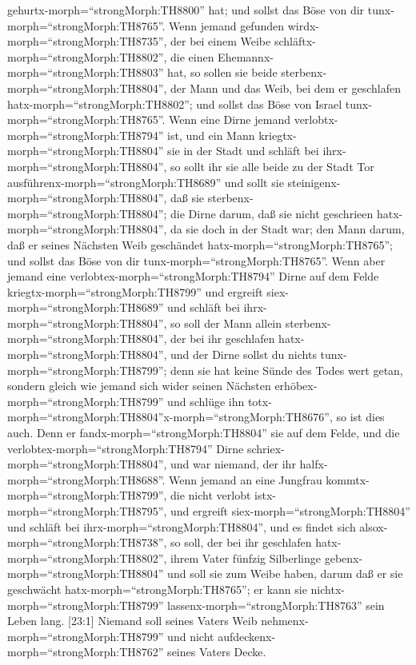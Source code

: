 gehurtx-morph=``strongMorph:TH8800'' hat; und sollst das Böse von dir
tunx-morph=``strongMorph:TH8765''.  Wenn jemand gefunden
wirdx-morph=``strongMorph:TH8735'', der bei einem Weibe
schläftx-morph=``strongMorph:TH8802'', die einen
Ehemannx-morph=``strongMorph:TH8803'' hat, so sollen sie beide
sterbenx-morph=``strongMorph:TH8804'', der Mann und das Weib, bei dem er
geschlafen hatx-morph=``strongMorph:TH8802''; und sollst das Böse von
Israel tunx-morph=``strongMorph:TH8765''.  Wenn eine Dirne
jemand verlobtx-morph=``strongMorph:TH8794'' ist, und ein Mann
kriegtx-morph=``strongMorph:TH8804'' sie in der Stadt und schläft bei
ihrx-morph=``strongMorph:TH8804'',  so sollt ihr sie alle
beide zu der Stadt Tor ausführenx-morph=``strongMorph:TH8689'' und sollt
sie steinigenx-morph=``strongMorph:TH8804'', daß sie
sterbenx-morph=``strongMorph:TH8804''; die Dirne darum, daß sie nicht
geschrieen hatx-morph=``strongMorph:TH8804'', da sie doch in der Stadt
war; den Mann darum, daß er seines Nächsten Weib geschändet
hatx-morph=``strongMorph:TH8765''; und sollst das Böse von dir
tunx-morph=``strongMorph:TH8765''.  Wenn aber jemand eine
verlobtex-morph=``strongMorph:TH8794'' Dirne auf dem Felde
kriegtx-morph=``strongMorph:TH8799'' und ergreift
siex-morph=``strongMorph:TH8689'' und schläft bei
ihrx-morph=``strongMorph:TH8804'', so soll der Mann allein
sterbenx-morph=``strongMorph:TH8804'', der bei ihr geschlafen
hatx-morph=``strongMorph:TH8804'',  und der Dirne sollst du
nichts tunx-morph=``strongMorph:TH8799''; denn sie hat keine Sünde des
Todes wert getan, sondern gleich wie jemand sich wider seinen Nächsten
erhöbex-morph=``strongMorph:TH8799'' und schlüge ihn
totx-morph=``strongMorph:TH8804''\textbar x-morph=``strongMorph:TH8676'',
so ist dies auch.  Denn er
fandx-morph=``strongMorph:TH8804'' sie auf dem Felde, und die
verlobtex-morph=``strongMorph:TH8794'' Dirne
schriex-morph=``strongMorph:TH8804'', und war niemand, der ihr
halfx-morph=``strongMorph:TH8688''.  Wenn jemand an eine
Jungfrau kommtx-morph=``strongMorph:TH8799'', die nicht verlobt
istx-morph=``strongMorph:TH8795'', und ergreift
siex-morph=``strongMorph:TH8804'' und schläft bei
ihrx-morph=``strongMorph:TH8804'', und es findet sich
alsox-morph=``strongMorph:TH8738'',  so soll, der bei ihr
geschlafen hatx-morph=``strongMorph:TH8802'', ihrem Vater fünfzig
Silberlinge gebenx-morph=``strongMorph:TH8804'' und soll sie zum Weibe
haben, darum daß er sie geschwächt hatx-morph=``strongMorph:TH8765''; er
kann sie nichtx-morph=``strongMorph:TH8799''
lassenx-morph=``strongMorph:TH8763'' sein Leben lang. 
{[}23:1{]} Niemand soll seines Vaters Weib
nehmenx-morph=``strongMorph:TH8799'' und nicht
aufdeckenx-morph=``strongMorph:TH8762'' seines Vaters Decke.

